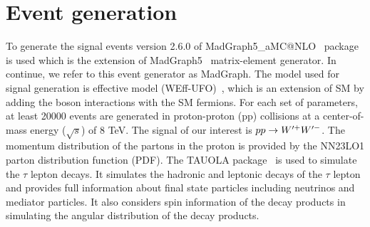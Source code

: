 \section{Event generation}\label{sec:simulation}


To generate the signal events version 2.6.0 of   MadGraph5\_aMC@NLO~\cite{Alwall:2014hca} package is used which is the extension of MadGraph5~\cite{Alwall:2011uj} matrix-element generator. In continue, we refer to this event generator  as MadGraph.
The model used for signal generation is \wprime effective model (WEff-UFO)~\cite{Sullivan:2002jt}, which  is an extension of SM by adding the \wprime boson interactions with the SM fermions.
For each set of parameters, at least 20000 events are generated in proton-proton (pp) collisions at a center-of-mass energy ($\sqrt{s}$) of 8 TeV. The signal of our interest is $ pp\rightarrow W^{\prime+} W^{\prime-}$. The momentum distribution of the partons in the proton is provided by the NN23LO1 \cite{Ball:2013hta} parton distribution function (PDF). The TAUOLA package~\cite{Davidson:2010rw} is used to simulate the $\tau$ lepton decays. It simulates the hadronic and leptonic decays of the $\tau$ lepton and provides full information about final state particles including neutrinos and mediator particles. It also considers spin information of the decay products in simulating the angular distribution of the decay products.

